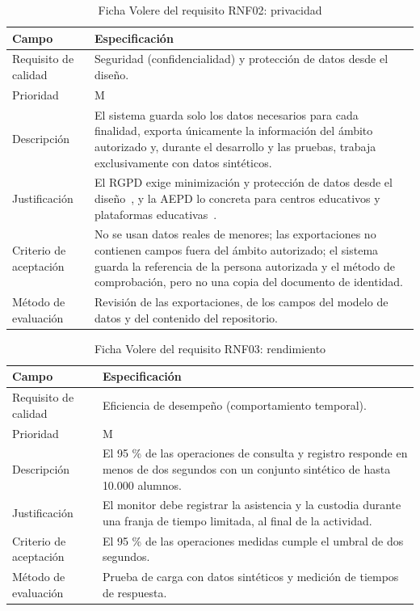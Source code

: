 \begin{table}[H]
\centering\small
\begin{tabularx}{\textwidth}{>{\hsize=0.385\hsize\raggedright\arraybackslash}X>{\hsize=1.615\hsize\raggedright\arraybackslash}X}
\toprule
\rowcolor{cabeceratabla} \textbf{Campo} & \textbf{Especificación} \\
\midrule
Requisito de calidad & Seguridad (confidencialidad) y protección de datos desde el diseño. \\
Prioridad & M \\
Descripción & El sistema guarda solo los datos necesarios para cada finalidad, exporta únicamente la información del ámbito autorizado y, durante el desarrollo y las pruebas, trabaja exclusivamente con datos sintéticos. \\
Justificación & El RGPD exige minimización y protección de datos desde el diseño~\cite{ref03}, y la AEPD lo concreta para centros educativos y plataformas educativas~\cite{ref02,ref04}. \\
Criterio de aceptación & No se usan datos reales de menores; las exportaciones no contienen campos fuera del ámbito autorizado; el sistema guarda la referencia de la persona autorizada y el método de comprobación, pero no una copia del documento de identidad. \\
Método de evaluación & Revisión de las exportaciones, de los campos del modelo de datos y del contenido del repositorio. \\
\bottomrule
\end{tabularx}
\caption{Ficha Volere del requisito RNF02: privacidad}\label{tab:rnf02}
\end{table}

\begin{table}[H]
\centering\small
\begin{tabularx}{\textwidth}{>{\hsize=0.385\hsize\raggedright\arraybackslash}X>{\hsize=1.615\hsize\raggedright\arraybackslash}X}
\toprule
\rowcolor{cabeceratabla} \textbf{Campo} & \textbf{Especificación} \\
\midrule
Requisito de calidad & Eficiencia de desempeño (comportamiento temporal). \\
Prioridad & M \\
Descripción & El 95 \% de las operaciones de consulta y registro responde en menos de dos segundos con un conjunto sintético de hasta 10.000 alumnos. \\
Justificación & El monitor debe registrar la asistencia y la custodia durante una franja de tiempo limitada, al final de la actividad. \\
Criterio de aceptación & El 95 \% de las operaciones medidas cumple el umbral de dos segundos. \\
Método de evaluación & Prueba de carga con datos sintéticos y medición de tiempos de respuesta. \\
\bottomrule
\end{tabularx}
\caption{Ficha Volere del requisito RNF03: rendimiento}\label{tab:rnf03}
\end{table}

